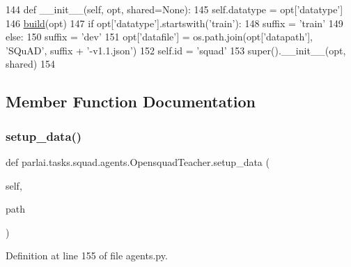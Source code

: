 \begin{DoxyCode}
144     \textcolor{keyword}{def }\_\_init\_\_(self, opt, shared=None):
145         self.datatype = opt[\textcolor{stringliteral}{'datatype'}]
146         \hyperlink{namespaceparlai_1_1mturk_1_1tasks_1_1talkthewalk_1_1download_a8c0fbb9b6dfe127cb8c1bd6e7c4e33fd}{build}(opt)
147         \textcolor{keywordflow}{if} opt[\textcolor{stringliteral}{'datatype'}].startswith(\textcolor{stringliteral}{'train'}):
148             suffix = \textcolor{stringliteral}{'train'}
149         \textcolor{keywordflow}{else}:
150             suffix = \textcolor{stringliteral}{'dev'}
151         opt[\textcolor{stringliteral}{'datafile'}] = os.path.join(opt[\textcolor{stringliteral}{'datapath'}], \textcolor{stringliteral}{'SQuAD'}, suffix + \textcolor{stringliteral}{'-v1.1.json'})
152         self.id = \textcolor{stringliteral}{'squad'}
153         super().\_\_init\_\_(opt, shared)
154 
\end{DoxyCode}


\subsection{Member Function Documentation}
\mbox{\label{classparlai_1_1tasks_1_1squad_1_1agents_1_1OpensquadTeacher_a3cec5f85dee7d30e1a80a4ce8c775a07}} 
\subsubsection{\texorpdfstring{setup\+\_\+data()}{setup\_data()}}
{\footnotesize\ttfamily def parlai.\+tasks.\+squad.\+agents.\+Opensquad\+Teacher.\+setup\+\_\+data (\begin{DoxyParamCaption}\item[{}]{self,  }\item[{}]{path }\end{DoxyParamCaption})}



Definition at line 155 of file agents.\+py.


